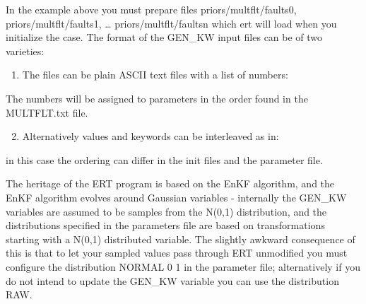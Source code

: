 \documentclass[letterpaper,10pt,english]{sphinxmanual}
\begin{document}
\begin{sphinxShadowBox}
In the example above you must prepare files priors/multflt/faults0,
priors/multflt/faults1, … priors/multflt/faultsn which ert will load when
you initialize the case. The format of the GEN\_KW input files can be of two
varieties:
\begin{enumerate}
\item {} 
The files can be plain ASCII text files with a list of numbers:

\end{enumerate}

%
\begin{sphinxVerbatim}[commandchars=\\\{\}]
\end{sphinxVerbatim}

The numbers will be assigned to parameters in the order found in the
MULTFLT.txt file.
\begin{enumerate}
\setcounter{enumi}{1}
\item {} 
Alternatively values and keywords can be interleaved as in:

\end{enumerate}

%
\begin{sphinxVerbatim}[commandchars=\\\{\}]
 
 
\end{sphinxVerbatim}

in this case the ordering can differ in the init files and the parameter file.

The heritage of the ERT program is based on the EnKF algorithm, and the EnKF
algorithm evolves around Gaussian variables - internally the GEN\_KW variables
are assumed to be samples from the N(0,1) distribution, and the distributions
specified in the parameters file are based on transformations starting with a
N(0,1) distributed variable. The slightly awkward consequence of this is that
to let your sampled values pass through ERT unmodified you must configure the
distribution NORMAL 0 1 in the parameter file; alternatively if you do not
intend to update the GEN\_KW variable you can use the distribution RAW.
\end{sphinxShadowBox}
\label{\detokenize{keywords/index:gen-param}}
\end{document}
